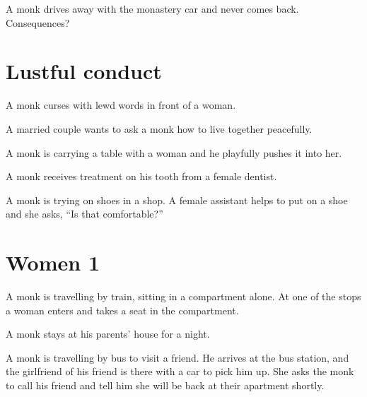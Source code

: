 A monk drives away with the monastery car and never comes back.
Consequences?

\section{Lustful conduct}

A monk curses with lewd words in front of a woman.

A married couple wants to ask a monk how to live together peacefully.

A monk is carrying a table with a woman and he playfully pushes it into
her.

A monk receives treatment on his tooth from a female dentist.

A monk is trying on shoes in a shop. A female assistant helps to put on
a shoe and she asks, ``Is that comfortable?''

\section{Women 1}

\enlargethispage{3\baselineskip}

A monk is travelling by train, sitting in a compartment alone. At one of
the stops a woman enters and takes a seat in the compartment.

A monk stays at his parents' house for a night.

A monk is travelling by bus to visit a friend. He arrives at the bus
station, and the girlfriend of his friend is there with a car to pick
him up. She asks the monk to call his friend and tell him she will be
back at their apartment shortly.

